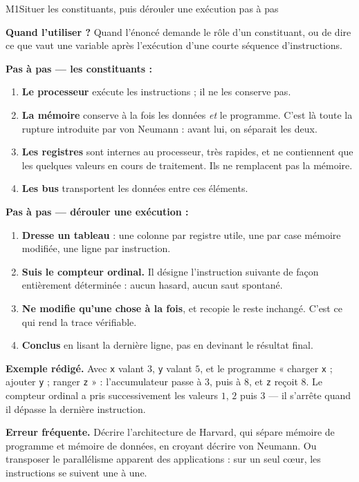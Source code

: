 \begin{fichemethode}{M1}{Situer les constituants, puis dérouler une exécution pas à pas}

\textbf{Quand l'utiliser ?} Quand l'énoncé demande le rôle d'un constituant, ou de dire ce que
vaut une variable après l'exécution d'une courte séquence d'instructions.

\textbf{Pas à pas — les constituants :}
\begin{enumerate}
  \item \textbf{Le processeur} exécute les instructions ; il ne les conserve pas.
  \item \textbf{La mémoire} conserve à la fois les données \emph{et} le programme. C'est là
        toute la rupture introduite par von Neumann : avant lui, on séparait les deux.
  \item \textbf{Les registres} sont internes au processeur, très rapides, et ne contiennent que
        les quelques valeurs en cours de traitement. Ils ne remplacent pas la mémoire.
  \item \textbf{Les bus} transportent les données entre ces éléments.
\end{enumerate}

\textbf{Pas à pas — dérouler une exécution :}
\begin{enumerate}
  \item \textbf{Dresse un tableau} : une colonne par registre utile, une par case mémoire
        modifiée, une ligne par instruction.
  \item \textbf{Suis le compteur ordinal.} Il désigne l'instruction suivante de façon
        entièrement déterminée : aucun hasard, aucun saut spontané.
  \item \textbf{Ne modifie qu'une chose à la fois}, et recopie le reste inchangé. C'est ce qui
        rend la trace vérifiable.
  \item \textbf{Conclus} en lisant la dernière ligne, pas en devinant le résultat final.
\end{enumerate}

\textbf{Exemple rédigé.} Avec \lstinline{x} valant $3$, \lstinline{y} valant $5$, et le
programme « charger \lstinline{x} ; ajouter \lstinline{y} ; ranger \lstinline{z} » :
l'accumulateur passe à $3$, puis à $8$, et \lstinline{z} reçoit $8$. Le compteur ordinal a pris
successivement les valeurs $1$, $2$ puis $3$ — il s'arrête quand il dépasse la dernière
instruction.

\textbf{Erreur fréquente.} Décrire l'architecture de Harvard, qui sépare mémoire de programme
et mémoire de données, en croyant décrire von Neumann. Ou transposer le parallélisme apparent
des applications : sur un seul cœur, les instructions se suivent une à une.

\end{fichemethode}
